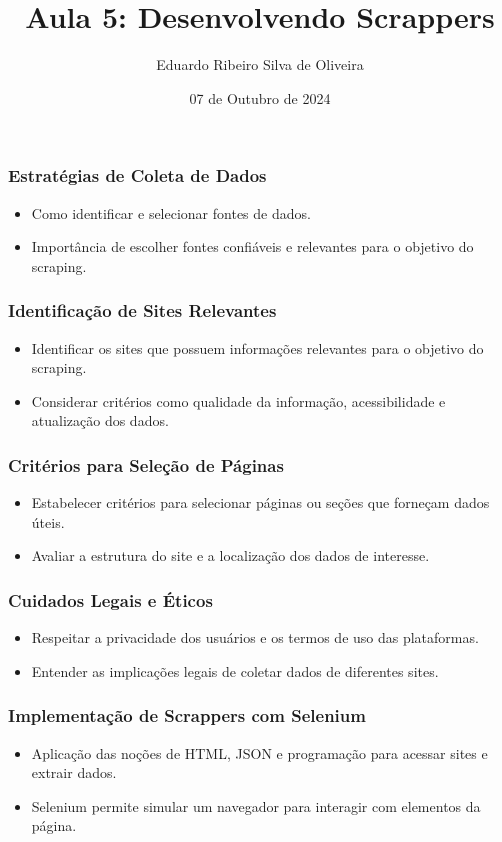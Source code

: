 \documentclass{beamer}
\title{Aula 5: Desenvolvendo Scrappers}
\author{Eduardo Ribeiro Silva de Oliveira}
\date{07 de Outubro de 2024}
\begin{document}
\frame{\titlepage}

\begin{frame}
  \frametitle{Estratégias de Coleta de Dados}
  \begin{itemize}
    \item Como identificar e selecionar fontes de dados.
    \item Importância de escolher fontes confiáveis e relevantes para o objetivo do scraping.
  \end{itemize}
\end{frame}

\begin{frame}
  \frametitle{Identificação de Sites Relevantes}
  \begin{itemize}
    \item Identificar os sites que possuem informações relevantes para o objetivo do scraping.
    \item Considerar critérios como qualidade da informação, acessibilidade e atualização dos dados.
  \end{itemize}
\end{frame}

\begin{frame}
  \frametitle{Critérios para Seleção de Páginas}
  \begin{itemize}
    \item Estabelecer critérios para selecionar páginas ou seções que forneçam dados úteis.
    \item Avaliar a estrutura do site e a localização dos dados de interesse.
  \end{itemize}
\end{frame}

\begin{frame}
  \frametitle{Cuidados Legais e Éticos}
  \begin{itemize}
    \item Respeitar a privacidade dos usuários e os termos de uso das plataformas.
    \item Entender as implicações legais de coletar dados de diferentes sites.
  \end{itemize}
\end{frame}

\begin{frame}
  \frametitle{Implementação de Scrappers com Selenium}
  \begin{itemize}
    \item Aplicação das noções de HTML, JSON e programação para acessar sites e extrair dados.
    \item Selenium permite simular um navegador para interagir com elementos da página.
  \end{itemize}
\end{frame}
\end{document}
